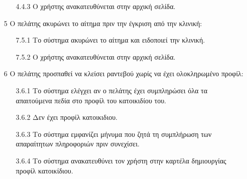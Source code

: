 \documentclass[12pt,a4paper,twoside]{book}
\begin{document}
\begin{enumerate}
\begin{enumerate}
          \item[4.4.3 ] Ο χρήστης  ανακατευθύνεται στην αρχική σελίδα. %
        \end{enumerate}
  \item[5 ] Ο πελάτης ακυρώνει το αίτημα πριν την έγκριση από την κλινική:
        \begin{enumerate}
          \item[7.5.1 ] Το σύστημα ακυρώνει το αίτημα και ειδοποιεί την κλινική. %
          \item[7.5.2 ] Ο χρήστης  ανακατευθύνεται στην αρχική σελίδα. %
        \end{enumerate}
  \item[6 ] Ο πελάτης προσπαθεί να κλείσει ραντεβού χωρίς να έχει ολοκληρωμένο προφίλ:
        \begin{enumerate}
          \item[3.6.1 ] Το σύστημα ελέγχει αν ο πελάτης έχει συμπληρώσει όλα τα απαιτούμενα πεδία στο προφίλ του κατοικιδίου του. %
          \item[3.6.2 ] Δεν έχει προφίλ κατοικιδιου. %
          \item[3.6.3 ] Το σύστημα εμφανίζει μήνυμα που ζητά τη συμπλήρωση των απαραίτητων πληροφοριών πριν συνεχίσει. %
          \item[3.6.4 ] Το σύστημα ανακατευθύνει τον χρήστη στην καρτέλα δημιουργίας προφίλ κατοικίδιου. %
        \end{enumerate}
\end{enumerate}
\end{document}
